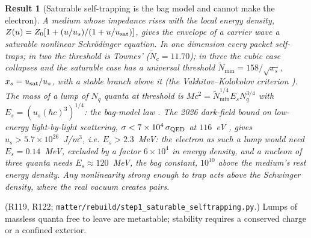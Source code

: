 \documentclass[11pt,a4paper]{article}
\newtheorem{prop}{Result}
\begin{document}
\begin{prop}[Saturable self-trapping is the bag model and cannot make the electron]
A medium whose impedance rises with the local energy density, $Z(u) = Z_0[1 + (u/u_s)/(1 + u/u_{\rm sat})]$, gives the envelope of a carrier wave a saturable nonlinear Schr\"odinger equation. In one dimension every packet self-traps; in two the threshold is Townes' \cite{townes1964} ($\tilde N_c = 11.70$); in three the cubic case collapses and the saturable case has a universal threshold $\tilde N_{\min} = 158/\sqrt{x_s}$, $x_s = u_{\rm sat}/u_s$, with a stable branch above it (the Vakhitov--Kolokolov criterion \cite{vk1973}). The mass of a lump of $N_q$ quanta at threshold is $Mc^2 = \tilde N_{\min}^{1/4}E_s N_q^{3/4}$ with $E_s = (u_s(\hbar c)^3)^{1/4}$: the bag-model law \cite{bag1974}. The 2026 dark-field bound on low-energy light-by-light scattering, $\sigma < 7\times10^{4}\,\sigma_{\rm QED}$ at $116$~eV \cite{hibef2026}, gives $u_s > 5.7\times10^{26}$~J/m$^3$, i.e. $E_s > 2.3$~MeV: the electron as such a lump would need $E_s = 0.14$~MeV, excluded by a factor $6\times10^4$ in energy density, and a nucleon of three quanta needs $E_s \approx 120$~MeV, the bag constant, $10^{10}$ above the medium's rest energy density. Any nonlinearity strong enough to trap acts above the Schwinger density, where the real vacuum creates pairs.
\end{prop}
\noindent(R119, R122; \texttt{matter/rebuild/step1\_saturable\_selftrapping.py}.) Lumps of massless quanta free to leave are metastable; stability requires a conserved charge or a confined exterior.
\end{document}
